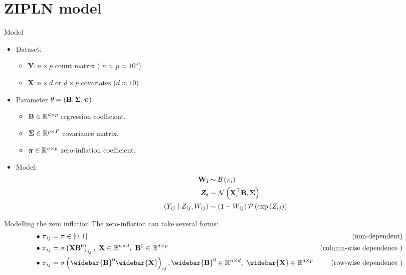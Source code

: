 \documentclass{beamer}
\theoremstyle{remark}
\begin{document}
\section{ZIPLN model}
\begin{frame}{Model}
\begin{itemize}
    \item Dataset:
    \begin{itemize}
        \item $\boldsymbol{Y}: n \times p$ count matrix ( $n \approx p \approx 10^4$)
        \item $\boldsymbol{X}: n\times d $ or $d \times p$ covariates ($d \approx 10$)
    \end{itemize}
    \item Parameter $\theta = \left(\boldsymbol{\mathbf{B}},\boldsymbol{\mathbf{\Sigma}}, \boldsymbol{\mathbf{\pi}}\right) $
    \begin{itemize}
        \item $\boldsymbol{\mathbf{B}} \in \mathbb R^{d\times p} $ regression coefficient.
        \item $\boldsymbol{\mathbf{\Sigma}} \in \mathbb R^{p\times P }$ covariance matrix.
        \item $\boldsymbol{\mathbf{\pi}} \in \mathbb R^{n\times p}$ zero-inflation coefficient.
    \end{itemize}
    \item Model:%
\begin{align*}
    \mathbf{W_{i}}  & \sim \mathbf{\mathcal{B}}\left(\pi_i\right) \\
    \boldsymbol{Z_{i}} & \sim \mathcal  N\left( \boldsymbol{\mathbf{X}}_i^{\top} \boldsymbol{\mathbf{B}}, \boldsymbol{\mathbf{\Sigma}} \right)  \\
    \left(Y_{ij}   \mid Z_{i j}, W_{ij} \right) & \sim \left( 1- W_{ij} \right) \mathcal{P}\left(\exp \left( Z_{i j}\right)\right)
 \end{align*}
\end{itemize}
\end{frame}
\begin{frame}{Modelling the zero inflation}
    The zero-inflation can take several forms:
 \begin{subequations}
\begin{align*}
\bullet ~ \pi_{ij}  & = \pi \in [0,1]& \text{(non-dependent)}  \\
 \bullet ~ \pi_{ij} & = \sigma\left( \mathbf X\mathbf B^0\right)_{ij}, ~ \mathbf X \in \mathbb R^{n \times d}, ~ \mathbf B^0 \in \mathbb R^{d\times p} &  \text{(column-wise dependence )} \\
\bullet ~ \pi_{ij} & = \sigma\left(\widebar{\mathbf{B}}^0 \widebar{\mathbf{X}}\right)_{ij},  \widebar{\mathbf{B}}^0 \in \mathbb R^{n \times d}, ~ \widebar{\mathbf X} \in \mathbb R^{d\times p}& \text{(row-wise dependence )}
\end{align*}
\end{subequations}
\end{frame}
\end{document}
